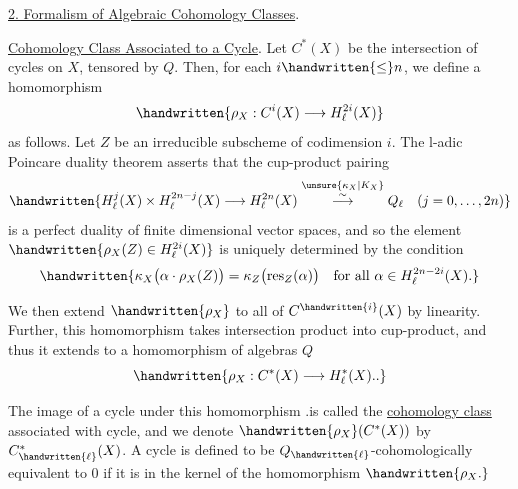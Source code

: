 \uline{2. Formalism of Algebraic Cohomology Classes}.

\uline{Cohomology Class Associated to a Cycle}. Let $C^*(X)$ be the intersection of cycles on $X$, tensored by $Q$. Then, for each $i\handwritten{\leq}n$, we define a homomorphism
\[
\handwritten{\rho_X:C^i(X)\longrightarrow H_\ell^{2i}(X)}
\]
as follows. Let $Z$ be an irreducible subscheme of codimension $i$. The l-adic Poincare duality theorem asserts that the cup-product pairing
\[
\handwritten{H_\ell^j(X)\times H_\ell^{2n-j}(X)\longrightarrow H_\ell^{2n}(X)\overset{\unsure{\kappa_X|K_X}}{\overset{\sim}{\longrightarrow}}Q_\ell\quad(j=0,\ldots,2n)}
\]
is a perfect duality of finite dimensional vector spaces, and so the element $\handwritten{\rho_X(Z)\in H_\ell^{2i}(X)}$ is uniquely determined by the condition
\[
\handwritten{\kappa_X\bigl(\alpha\cdot\rho_X(Z)\bigr)=\kappa_Z\bigl(\operatorname{res}_Z(\alpha)\bigr)\quad\text{for all }\alpha\in H_\ell^{2n-2i}(X).}
\]

We then extend $\handwritten{\rho_X}$ to all of $C^{\handwritten{i}}(X)$ by linearity. Further, this homomorphism takes intersection product into cup-product, and thus it extends to a homomorphism of algebras  $Q$
\[
\handwritten{\rho_X:C^*(X)\longrightarrow H_\ell^*(X)..}
\]

The image of a cycle under this homomorphism .is called the \uline{cohomology class} associated with  cycle, and we denote $\handwritten{\rho_X}(C^*(X))$ by $C_{\handwritten{\ell}}^*(X)$. A cycle is defined to be $Q_{\handwritten{\ell}}$-cohomologically equivalent to $0$ if it is in the kernel of the homomorphism $\handwritten{\rho_X.}$
